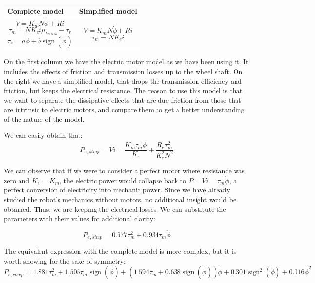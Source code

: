 \documentclass[12pt]{article}
\begin{document}
\begin{center}
	\begin{tabular}{ | m{12em} | m{10em}| } 
		\hline
		Complete model & Simplified model \\ 
		\hline
		$$ V = K_m N\dot{\phi} + Ri$$
		$$ \tau_m = N K_ei\mu_{trans} - \tau_r$$
		$$ \tau_r = a \dot{\phi} + b \operatorname{sign}(\dot{\phi}) $$ &
		$$ V = K_m N\dot{\phi} + Ri$$
		$$ \tau_m = N K_ei$$ \\ 
		\hline
	\end{tabular}
\end{center}
On the first column we have the electric motor model as we have been using it. It includes the effects of friction and transmission losses up to the wheel shaft. On the right we have a simplified model, that drops the transmission efficiency and friction, but keeps the electrical resistance. The reason to use this model is that we want to separate the dissipative effects that are due friction from those that are intrinsic to electric motors, and compare them to get a better understanding of the nature of the model.

We can easily obtain that:
$$P_{e, simp} = Vi = \frac{K_{m} \tau_{m} \dot{\phi}}{K_{e}} + \frac{R_{e} \tau_{m}^{2}}{K_{e}^{2} N^{2}}$$

We can observe that if we were to consider a perfect motor where resistance was zero and $K_e = K_m$, the electric power would collapse back to $P = Vi = \tau_{m} \dot{\phi}$, a perfect conversion of electricity into mechanic power. Since we have already studied the robot's mechanics without motors, no additional insight would be obtained. Thus, we are keeping the electrical losses. We can substitute the parameters with their values for additional clarity:

$$ P_{e, simp} = 0.677 \tau_{m}^{2} + 0.934 \tau_{m} \dot{\phi}$$

The equivalent expression with the complete model is more complex, but it is worth showing for the sake of symmetry:
$$ P_{e,comp} = 1.881 \tau_{m}^{2} + 1.505 \tau_{m} \operatorname{sign}\left(\dot{\phi}\right) + \left(1.594 \tau_{m} + 0.638 \operatorname{sign}\left(\dot{\phi}\right)\right) \dot{\phi} + 0.301 \operatorname{sign}^{2}\left(\dot{\phi}\right) + 0.016 \dot{\phi}^{2}$$
\end{document}
